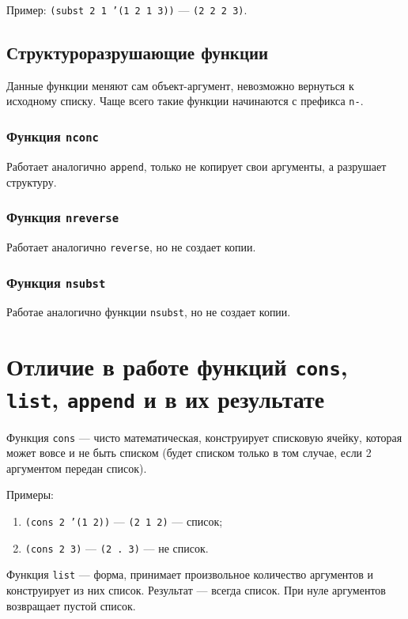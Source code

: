 Пример: \texttt{(subst 2 1 '(1 2 1 3))} --- \texttt{(2 2 2 3)}.

\subsection{Структуроразрушающие функции}

Данные функции меняют сам объект-аргумент, невозможно вернуться к исходному списку. Чаще всего такие функции начинаются с префикса \texttt{n-}.

\subsubsection{Функция \texttt{nconc}}

Работает аналогично \texttt{append}, только не копирует свои аргументы, а разрушает структуру.

\subsubsection{Функция \texttt{nreverse}}

Работает аналогично \texttt{reverse}, но не создает копии.

\subsubsection{Функция \texttt{nsubst}}

Работае аналогично функции \texttt{nsubst}, но не создает копии.

\section{Отличие в работе функций \texttt{cons}, \texttt{list}, \texttt{append} и в их результате}

Функция \texttt{cons} --- чисто математическая, конструирует списковую ячейку, которая может вовсе и не быть списком (будет списком только в том случае, если 2 аргументом передан список).

Примеры:
\begin{enumerate}
    \item \texttt{(cons 2 '(1 2))} --- \texttt{(2 1 2)} --- список;
    \item \texttt{(cons 2 3)} --- \texttt{(2 . 3)} --- не список.
\end{enumerate}

Функция \texttt{list} --- форма, принимает произвольное количество аргументов и конструирует из них список. Результат --- всегда список. При нуле аргументов возвращает пустой список.


